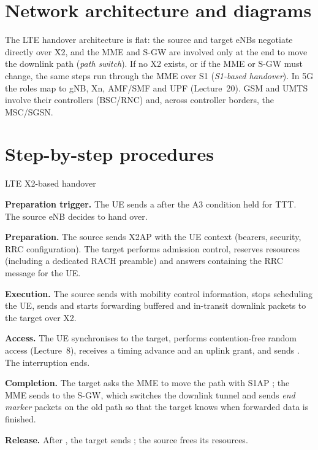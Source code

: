 \documentclass[11pt,a4paper]{article}
\begin{document}
\section{Network architecture and diagrams}
The LTE handover architecture is flat: the source and target eNBs negotiate directly over X2,
and the MME and S-GW are involved only at the end to move the downlink path (\emph{path switch}).
If no X2 exists, or if the MME or S-GW must change, the same steps run through the MME over S1
(\emph{S1-based handover}). In 5G the roles map to gNB, Xn, AMF/SMF and UPF (Lecture~20). GSM
and UMTS involve their controllers (BSC/RNC) and, across controller borders, the MSC/SGSN.

\section{Step-by-step procedures}

\begin{procedurebox}{LTE X2-based handover}\label{proc:x2}
\begin{steps}
  \item \textbf{Preparation trigger.} The UE sends a  after the A3 condition
        held for TTT. The source eNB decides to hand over.
  \item \textbf{Preparation.} The source sends X2AP  with the UE context (bearers,
        security, RRC configuration). The target performs admission control, reserves resources
        (including a dedicated RACH preamble) and answers 
        containing the RRC message for the UE.
  \item \textbf{Execution.} The source sends  with mobility
        control information, stops scheduling the UE, sends  and starts
        forwarding buffered and in-transit downlink packets to the target over X2.
  \item \textbf{Access.} The UE synchronises to the target, performs contention-free random access
        (Lecture~8), receives a timing advance and an uplink grant, and sends
        . The interruption ends.
  \item \textbf{Completion.} The target asks the MME to move the path with S1AP
        ; the MME sends  to the S-GW, which switches
        the downlink tunnel and sends \emph{end marker} packets on the old path so that the target
        knows when forwarded data is finished.
  \item \textbf{Release.} After , the target sends
        ; the source frees its resources.
\end{steps}
\end{procedurebox}
\end{document}
